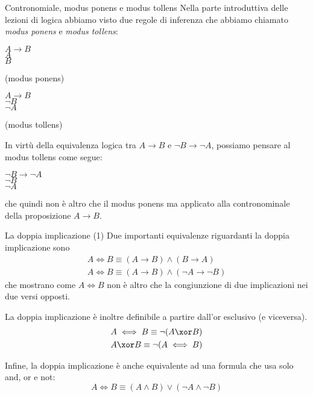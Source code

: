 \documentclass[10pt,dvipsnames]{beamer}
\begin{document}
\begin{frame}{Contronomiale, modus ponens e modus tollens}
    Nella parte introduttiva delle lezioni di logica abbiamo visto due regole di inferenza che abbiamo chiamato \emph{modus ponens} e \emph{modus tollens}:

    \medskip
    \begin{center}
    \begin{inference}
        $A \to B$\\
        $A$\\
        \hline
        $B$
    \end{inference}
    (modus ponens)
    \hspace{2cm}
    \begin{inference}
        $A \to B$\\
        $\neg B$\\
        \hline
        $\neg A$
    \end{inference}
    (modus tollens)
    \end{center}
    In virtù della equivalenza logica tra $A \to B$ e $\neg B \to \neg A$, possiamo pensare al modus tollens come segue:
    \begin{center}
    \begin{inference}
        $\neg B \to \neg A$\\
        $\neg B$\\
        \hline
        $\neg A$
    \end{inference}
    \end{center}
    che quindi non è altro che il modus ponens ma applicato alla contronominale della proposizione $A \to B$.
\end{frame}

\begin{frame}{La doppia implicazione (1)}
    Due importanti equivalenze riguardanti la doppia implicazione sono
    \begin{gather*}
        A \iff B \equiv (A \to B) \wedge (B \to A)\\
        A \iff B \equiv (A \to B) \wedge (\neg A \to \neg B)
    \end{gather*}
    che mostrano come $A \iff B$ non è altro che la congiunzione di due implicazioni nei due versi opposti.

    \pause \medskip
    La doppia implicazione è inoltre definibile a partire dall'or esclusivo (e viceversa).
    \begin{gather*}
        A \iff B \equiv \neg (A \xor B)\\
        A \xor B \equiv \neg (A \iff B)
    \end{gather*}

    \pause \medskip
    Infine, la doppia implicazione è anche equivalente ad una formula che usa solo and, or e not:
    \[
        A \iff B \equiv (A \wedge B) \vee (\neg A \wedge \neg B)
    \]
\end{frame}
\end{document}
